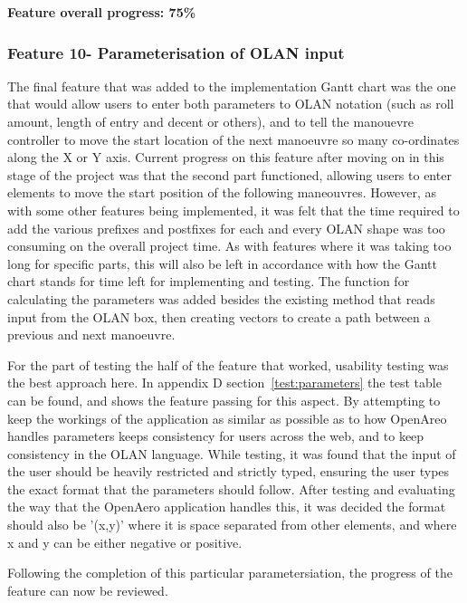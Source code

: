 \textbf{Feature overall progress: 75\%}

\subsubsection{Feature 10- Parameterisation of OLAN input}
The final feature that was added to the implementation Gantt chart was the one that would allow users to enter both parameters to OLAN notation (such as roll amount, length of entry and decent or others), and to tell the manouevre controller to move the start location of the next manoeuvre so many co-ordinates along the X or Y axis. Current progress on this feature after moving on in this stage of the project was that the second part functioned, allowing users to enter elements to move the start position of the following maneouvres. However, as with some other features being implemented, it was felt that the time required to add the various prefixes and postfixes for each and every OLAN shape was too consuming on the overall project time. As with features where it was taking too long for specific parts, this will also be left in accordance with how the Gantt chart stands for time left for implementing and testing. The function for calculating the parameters was added besides the existing method that reads input from the OLAN box, then creating vectors to create a path between a previous and next manoeuvre.

For the part of testing the half of the feature that worked, usability testing was the best approach here. In appendix D section~\ref{test:parameters} the test table can be found, and shows the feature passing for this aspect. By attempting to keep the workings of the application as similar as possible as to how OpenAreo handles parameters keeps consistency for users across the web, and to keep consistency in the OLAN language. While testing, it was found that the input of the user should be heavily restricted and strictly typed, ensuring the user types the exact format that the parameters should follow. After testing and evaluating the way that the OpenAero application handles this, it was decided the format should also be '(x,y)' where it is space separated from other elements, and where x and y can be either negative or positive.

Following the completion of this particular parametersiation, the progress of the feature can now be reviewed.

